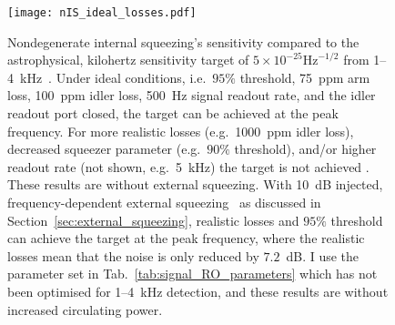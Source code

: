 \begin{figure}
    \centering
    \texttt{[image: nIS\_ideal\_losses.pdf]}
    \caption{  Nondegenerate internal squeezing's sensitivity compared to the astrophysical, kilohertz sensitivity target of $5\times10^{-25}\text{Hz}^{-1/2}$ from 1--4~kHz~\cite{miaoDesignGravitationalWaveDetectors2018}. Under ideal conditions, i.e.\ $95\%$ threshold, 75~ppm arm loss, 100~ppm idler loss, 500~Hz signal readout rate, and the idler readout port closed, the target can be achieved at the peak frequency. For more realistic losses (e.g.\ 1000~ppm idler loss), decreased squeezer parameter (e.g.\ $90\%$ threshold), and/or higher readout rate (not shown, e.g.\ 5~kHz) the target is not achieved . These results are without external squeezing. With 10~dB injected, frequency-dependent external squeezing~\cite{} as discussed in Section~\ref{sec:external_squeezing}, realistic losses and $95\%$ threshold can achieve the target at the peak frequency, where the realistic losses mean that the noise is only reduced by $7.2$~dB.
    I use the parameter set in Tab.~\ref{tab:signal_RO_parameters} which has not been optimised for 1--4~kHz detection, and these results are without increased circulating power.}
    \label{fig:nIS_sens_target}
\end{figure}

